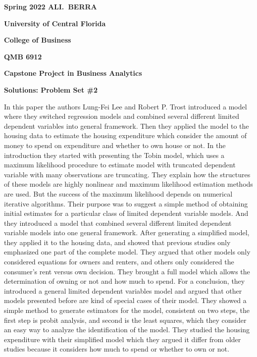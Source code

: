 \documentclass[12pt]{book}
\begin{document}
\pagestyle{empty}



{\noindent\bf Spring 2022 \hfill ALI.~BERRA}



\vskip 16pt



\centerline{\bf University of Central Florida}



\centerline{\bf College of Business}



\vskip 16pt



\centerline{\bf QMB 6912}



\centerline{\bf Capstone Project in Business Analytics}



\vskip 10pt



\centerline{\bf Solutions: Problem Set \#2}



\vskip 32pt
In this paper the authors Lung-Fei Lee and Robert P. Trost introduced a model where they switched regression models and combined several different limited dependent variables into general framework. 
\vskip 12pt
Then they applied the model to the housing data to estimate the housing expenditure which consider the amount of money to spend on expenditure and whether to own house or not.
\vskip 12pt
In the introduction they started with presenting the Tobin model, which uses a maximum likelihood procedure to estimate model with truncated dependent variable with many observations are truncating. 
\vskip 12pt
They explain how the structures of these models are highly nonlinear and maximum likelihood estimation methods are used. But the success of the maximum likelihood depends on numerical iterative algorithms. 
\vskip 12pt
Their purpose was to suggest a simple method of obtaining initial estimates for a particular class of limited dependent variable models.  And they introduced a model that combined several different limited dependent variable models into one general framework. 
\vskip 12pt
After generating a simplified model, they applied it to the housing data, and showed that previous studies only emphasized one part of the complete model. They argued that other models only considered equations for owners and renters, and others only considered the consumer’s rent versus own decision. They brought a full model which allows the determination of owning or not and how much to spend. 
\vskip 12pt
For a conclusion, they introduced a general limited dependent variables model and argued that other models presented before are kind of special cases of their model.  They showed a simple method to generate estimators for the model, consistent on two steps, the first step is probit analysis, and second is the least squares, which they consider an easy way to analyze the identification of the model.  
\vskip 12pt
They studied the housing expenditure with their simplified model which they argued it differ from older studies because it considers how much to spend or whether to own or not. 
\end{document}
